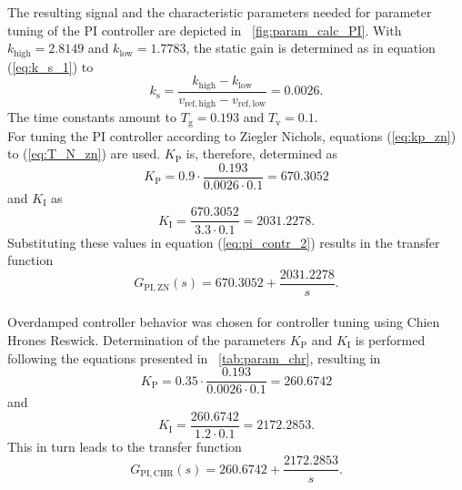 The resulting signal and the characteristic parameters needed for parameter tuning of the PI controller are depicted in \figurename~\ref{fig:param_calc_PI}. With $k_{\mathrm{high}}=2.8149$ and $k_{\mathrm{low}}=1.7783$, the static gain is determined as in equation (\ref{eq:k_s_1}) to
\begin{equation}
  k_{\mathrm{s}} = \frac{k_{\mathrm{high}}-k_{\mathrm{low}}}{v_{\mathrm{ref,high}}-v_{\mathrm{ref,low}}}= 0.0026.
\label{eq:k_s_2}
\end{equation}
The time constants amount to $T_{\mathrm{g}}=0.193$ and $T_{\mathrm{v}}=0.1$.
\\For tuning the PI controller according to Ziegler Nichols, equations (\ref{eq:kp_zn}) to (\ref{eq:T_N_zn}) are used. $K_{\mathrm{P}}$ is, therefore, determined as
\begin{equation}
  K_{\mathrm{P}} = 0.9\cdot\frac{0.193}{0.0026\cdot0.1}=670.3052
\end{equation}
and $K_{\mathrm{I}}$ as
\begin{equation}
  K_{\mathrm{I}}  = \frac{670.3052}{3.3\cdot0.1}=2031.2278.
\end{equation}
\newpage
Substituting these values in equation (\ref{eq:pi_contr_2}) results in the transfer function
\begin{equation}
  G_{\mathrm{PI,ZN}}(s)=670.3052+\frac{2031.2278}{s}.
\end{equation}
\\Overdamped controller behavior was chosen for controller tuning using Chien Hrones Reswick. Determination of the parameters $K_{\mathrm{P}}$ and $K_{\mathrm{I}}$ is performed following the equations presented in \tablename~\ref{tab:param_chr}, resulting in
\begin{equation}
  K_{\mathrm{P}} = 0.35\cdot\frac{0.193}{0.0026\cdot0.1}=260.6742
\end{equation}
and
\begin{equation}
  K_{\mathrm{I}} = \frac{260.6742}{1.2\cdot0.1}=2172.2853.
\end{equation}
This in turn leads to the transfer function
\begin{equation}
  G_{\mathrm{PI,CHR}}(s)=260.6742+\frac{2172.2853}{s}.
\end{equation}
\newpage

